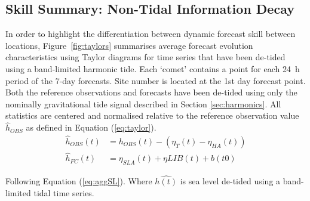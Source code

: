 \documentclass[jmse,article,accept,moreauthors,pdftex,10pt,a4paper]{mdpi}
\begin{document}
\subsection{Skill Summary: Non-Tidal Information Decay}
\label{sec:skill}

In order to highlight the differentiation between dynamic forecast skill between locations, Figure~\ref{fig:taylors} summarises average forecast evolution characteristics using Taylor diagrams \cite{Taylor:2000wp} for time series that have been de-tided using a band-limited harmonic tide.
Each `comet' contains a point for each 24~h period of the 7-day forecasts.
Site number is located at the 1st day forecast point.
Both the reference observations and forecasts have been de-tided using only the nominally gravitational tide signal described in Section \ref{sec:harmonics}.
All statistics are centered and normalised relative to the reference observation value $\hat{h}_{OBS}$ as defined in Equation (\ref{eq:taylor}).
\begin{equation}
\begin{split}
\hat{h}_{OBS}(t) &= h_{OBS}(t) - (\eta_{T}(t) - \eta_{HA}(t))  \\ 
\hat{h}_{FC}(t)  &= \eta_{SLA}(t) + \eta{LIB}(t) + b(t0) 
\label{eq:taylor}
\end{split}
\end{equation}

Following Equation (\ref {eq:aggSL}).  Where $\hat{h(t)}$ is sea level de-tided using a band-limited tidal time series.  
\end{document}
